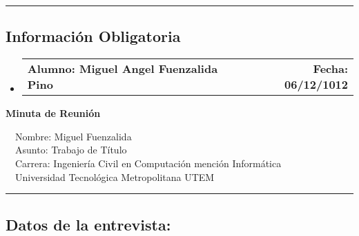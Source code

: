 \documentclass[10pt,letterpaper]{article}
\makeatletter
\newcommand{\headerrow}[2]
{\begin{tabular*}{\linewidth}{l@{\extracolsep{\fill}}r}
	#1 &
	#2 \\
\end{tabular*}}
\makeatother
\begin{document}
\hrule
\vspace{-0.4em}
\subsection*{Información Obligatoria}

\begin{itemize}
	\parskip=0.1em

	\item 
	\headerrow
		{\textbf{Alumno: Miguel Angel Fuenzalida Pino}}
		{\textbf{Fecha: 06/12/1012}}

\end{itemize}
\newpage
\begin{center}
{\LARGE \textbf{Minuta de Reunión}}

\ \ \textbullet Nombre: Miguel Fuenzalida
\\
\ \ \textbullet Asunto: Trabajo de Título
\\
\ \ \textbullet Carrera: Ingeniería Civil en Computación mención Informática
\\
\ \ \textbullet Universidad Tecnológica Metropolitana UTEM
\end{center}

\hrule
\vspace{-0.4em}
\subsection*{Datos de la entrevista:}
\end{document}
